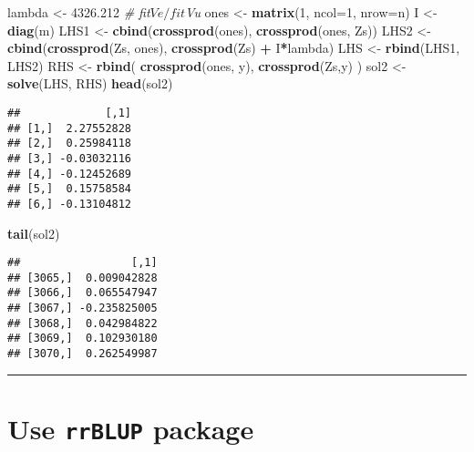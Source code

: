 \documentclass[
]{article}
\newenvironment{Shaded}{\begin{snugshade}}{\end{snugshade}}
\newcommand{\AttributeTok}[1]{\textcolor[rgb]{0.13,0.29,0.53}{#1}}
\newcommand{\CommentTok}[1]{\textcolor[rgb]{0.56,0.35,0.01}{\textit{#1}}}
\newcommand{\DecValTok}[1]{\textcolor[rgb]{0.00,0.00,0.81}{#1}}
\newcommand{\FloatTok}[1]{\textcolor[rgb]{0.00,0.00,0.81}{#1}}
\newcommand{\FunctionTok}[1]{\textcolor[rgb]{0.13,0.29,0.53}{\textbf{#1}}}
\newcommand{\NormalTok}[1]{#1}
\newcommand{\OtherTok}[1]{\textcolor[rgb]{0.56,0.35,0.01}{#1}}
\newcommand{\SpecialCharTok}[1]{\textcolor[rgb]{0.81,0.36,0.00}{\textbf{#1}}}
\begin{document}
\begin{Shaded}
\begin{Highlighting}[]
\NormalTok{lambda }\OtherTok{\textless{}{-}} \FloatTok{4326.212} \CommentTok{\# fit$Ve / fit$Vu}
\NormalTok{ones }\OtherTok{\textless{}{-}} \FunctionTok{matrix}\NormalTok{(}\DecValTok{1}\NormalTok{, }\AttributeTok{ncol=}\DecValTok{1}\NormalTok{, }\AttributeTok{nrow=}\NormalTok{n)}
\NormalTok{I }\OtherTok{\textless{}{-}} \FunctionTok{diag}\NormalTok{(m)}
\NormalTok{LHS1 }\OtherTok{\textless{}{-}} \FunctionTok{cbind}\NormalTok{(}\FunctionTok{crossprod}\NormalTok{(ones), }\FunctionTok{crossprod}\NormalTok{(ones, Zs)) }
\NormalTok{LHS2 }\OtherTok{\textless{}{-}} \FunctionTok{cbind}\NormalTok{(}\FunctionTok{crossprod}\NormalTok{(Zs, ones), }\FunctionTok{crossprod}\NormalTok{(Zs) }\SpecialCharTok{+}\NormalTok{  I}\SpecialCharTok{*}\NormalTok{lambda)}
\NormalTok{LHS }\OtherTok{\textless{}{-}} \FunctionTok{rbind}\NormalTok{(LHS1, LHS2)}
\NormalTok{RHS }\OtherTok{\textless{}{-}} \FunctionTok{rbind}\NormalTok{( }\FunctionTok{crossprod}\NormalTok{(ones, y), }\FunctionTok{crossprod}\NormalTok{(Zs,y) )}
\NormalTok{sol2 }\OtherTok{\textless{}{-}} \FunctionTok{solve}\NormalTok{(LHS, RHS)}
\FunctionTok{head}\NormalTok{(sol2)}
\end{Highlighting}
\end{Shaded}

\begin{verbatim}
##             [,1]
## [1,]  2.27552828
## [2,]  0.25984118
## [3,] -0.03032116
## [4,] -0.12452689
## [5,]  0.15758584
## [6,] -0.13104812
\end{verbatim}

\begin{Shaded}
\begin{Highlighting}[]
\FunctionTok{tail}\NormalTok{(sol2)}
\end{Highlighting}
\end{Shaded}

\begin{verbatim}
##                 [,1]
## [3065,]  0.009042828
## [3066,]  0.065547947
## [3067,] -0.235825005
## [3068,]  0.042984822
## [3069,]  0.102930180
## [3070,]  0.262549987
\end{verbatim}

\begin{center}\rule{0.5\linewidth}{0.5pt}\end{center}

\section{\texorpdfstring{Use \texttt{rrBLUP}
package}{Use rrBLUP package}}\label{use-rrblup-package}
\end{document}
